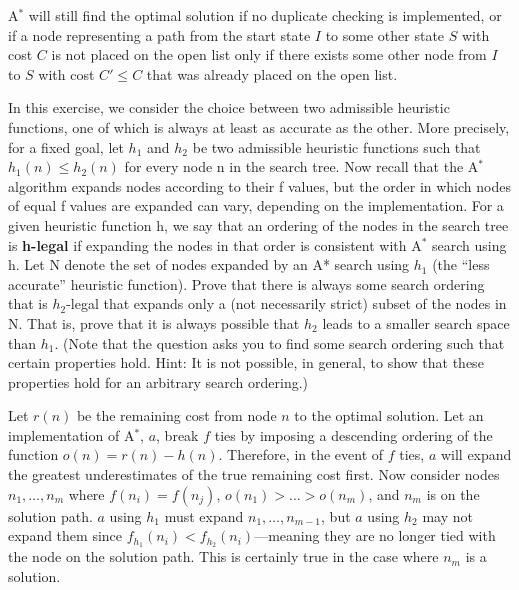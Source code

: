 \documentclass[12pt]{article}
\newenvironment{problem}[2][Problem]{\begin{trivlist}
\item[\hskip \labelsep {\bfseries #1}\hskip \labelsep {\bfseries #2.}]}{\end{trivlist}}
\begin{document}
\begin{problem}{3}
\begin{enumerate}
			\vspace{0.25cm}
			A$^*$ will still find the optimal solution if no duplicate checking is implemented, or if a node representing
			a path from the start state $I$ to some other state $S$ with cost $C$ is not placed on the open list only if there
			exists some other node from $I$ to $S$ with cost $C'\le C$ that was already placed on the open list.
\end{enumerate}
\end{problem}
\begin{problem}{4}
	In this exercise, we consider the choice between two admissible heuristic functions, one of which is always at least as accurate as the other.
	More precisely, for a fixed goal, let $h_1$ and $h_2$ be two admissible heuristic functions such that $h_1(n) \le h_2(n)$ for every node n in the search tree.
	Now recall that the A$^*$ algorithm expands nodes according to their f values, but the order in which nodes of equal f values are expanded can vary, depending on the implementation.
	For a given heuristic function h, we say that an ordering of the nodes in the search tree is \textbf{h-legal} if expanding the nodes in that order is consistent with A$^*$ search using h.
	Let N denote the set of nodes expanded by an A* search using $h_1$ (the ``less accurate'' heuristic function).
	Prove that there is always some search ordering that is $h_2$-legal that expands only a (not necessarily strict) subset of the nodes in N.
	That is, prove that it is always possible that $h_2$ leads to a smaller search space than $h_1$.
	(Note that the question asks you to find some search ordering such that certain properties hold.
	Hint: It is not possible, in general, to show that these properties hold for an arbitrary search ordering.)

	\vspace{0.25cm}
	Let $r(n)$ be the remaining cost from node $n$ to the optimal solution.
	Let an implementation of A$^*$, $a$, break $f$ ties by imposing a descending ordering of the function $o(n)=r(n)-h(n)$.
	Therefore, in the event of $f$ ties, $a$ will expand the greatest underestimates of the true remaining cost first.
	Now consider nodes $n_1,\dots,n_m$ where $f(n_i)=f(n_j)$, $o(n_1) > \dots > o(n_m)$, and $n_m$ is on the solution path.
	$a$ using $h_1$ must expand $n_1,\dots,n_{m-1}$, but $a$ using $h_2$ may not expand them since $f_{h_1}(n_i) < f_{h_2}(n_i)$---meaning they are no longer tied with the node on the solution path.
	This is certainly true in the case where $n_m$ is a solution.
\end{problem}
\end{document}
